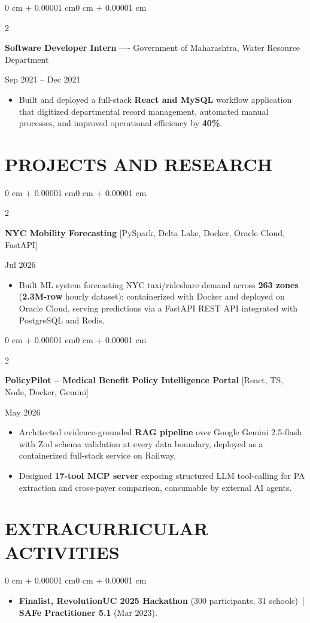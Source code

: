 \documentclass[10pt, letterpaper]{article}
\newenvironment{highlights}{
    \begin{itemize}[
        topsep=0.10 cm,
        parsep=0.06 cm,
        partopsep=0pt,
        itemsep=0.06 cm,
        leftmargin=12pt
    ]
}{
    \end{itemize}
}
\newenvironment{onecolentry}{
    \begin{adjustwidth}{0 cm + 0.00001 cm}{0 cm + 0.00001 cm}
}{
    \end{adjustwidth}
}
\newenvironment{twocolentry}[2][]{
    \onecolentry
    \def\secondColumn{#2}
    \setcolumnwidth{\fill, 4.5 cm}
    \begin{paracol}{2}
}{
    \switchcolumn \raggedleft \secondColumn
    \end{paracol}
    \endonecolentry
}
\begin{document}
\vspace{0.15 cm}

\begin{twocolentry}{Sep 2021 -- Dec 2021}
\textbf{Software Developer Intern} ---- Government of Maharashtra, Water Resource Department
\end{twocolentry}
\begin{highlights}
  \item Built and deployed a full-stack \textbf{React and MySQL} workflow application that digitized departmental record management, automated manual processes, and improved operational efficiency by \textbf{40\%}.
\end{highlights}

\section{PROJECTS AND RESEARCH}
\begin{twocolentry}{Jul 2026}
\textbf{NYC Mobility Forecasting} [PySpark, Delta Lake, Docker, Oracle Cloud, FastAPI]
\end{twocolentry}
\begin{highlights}
  \item Built ML system forecasting NYC taxi/rideshare demand across \textbf{263 zones} (\textbf{2.3M-row} hourly dataset); containerized with Docker and deployed on Oracle Cloud, serving predictions via a FastAPI REST API integrated with PostgreSQL and Redis.
\end{highlights}

\vspace{0.12 cm}

\begin{twocolentry}{May 2026}
\textbf{PolicyPilot -- Medical Benefit Policy Intelligence Portal} [React, TS, Node, Docker, Gemini]
\end{twocolentry}
\begin{highlights}
  \item Architected evidence-grounded \textbf{RAG pipeline} over Google Gemini 2.5-flash with Zod schema validation at every data boundary, deployed as a containerized full-stack service on Railway.
  \item Designed \textbf{17-tool MCP server} exposing structured LLM tool-calling for PA extraction and cross-payer comparison, consumable by external AI agents.
\end{highlights}

\section{EXTRACURRICULAR ACTIVITIES}
\begin{onecolentry}
\begin{highlights}
  \item \textbf{Finalist, RevolutionUC 2025 Hackathon} (300 participants, 31 schools) \,|\, \textbf{SAFe Practitioner 5.1} (Mar 2023).
\end{highlights}
\end{onecolentry}
\end{document}
